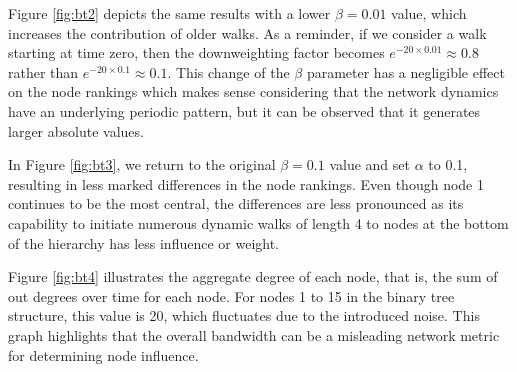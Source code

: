 Figure \ref{fig:bt2} depicts the same results with a lower $\beta=0.01$ value, which increases the contribution of older walks. As a reminder, if we consider a walk starting at time zero, then the  downweighting factor becomes $e^{−20 \times 0.01} \approx 0.8$ rather than $e^{−20 \times 0.1} \approx 0.1$. This change of the $\beta$ parameter has a negligible effect on the node rankings which makes sense considering that the network dynamics have an underlying periodic pattern, but it can be observed that it generates larger absolute values.

In Figure \ref{fig:bt3}, we return to the original $\beta=0.1$ value and set $\alpha$ to 0.1, resulting in less marked differences in the node rankings. Even though node 1 continues to be the most central, the differences are less pronounced as its capability to initiate numerous dynamic walks of length 4 to nodes at the bottom of the hierarchy has less influence or weight.

Figure \ref{fig:bt4} illustrates the aggregate degree of each node, that is, the sum of out degrees over time for each node. For nodes 1 to 15 in the binary tree structure, this value is 20,  which fluctuates due to the introduced noise. This graph highlights that the overall bandwidth  can be a misleading network metric for determining node influence. 

